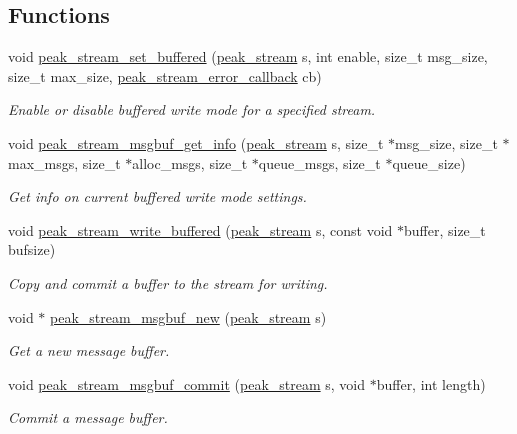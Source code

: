 \subsection*{Functions}
\begin{CompactItemize}
\item 
void \hyperlink{group__stream__buf_ga1}{peak\_\-stream\_\-set\_\-buffered} (\hyperlink{group__stream_ga0}{peak\_\-stream} s, int enable, size\_\-t msg\_\-size, size\_\-t max\_\-size, \hyperlink{group__stream__buf_ga0}{peak\_\-stream\_\-error\_\-callback} cb)
\begin{CompactList}\small\item\em Enable or disable buffered write mode for a specified stream. \item\end{CompactList}\item 
void \hyperlink{group__stream__buf_ga2}{peak\_\-stream\_\-msgbuf\_\-get\_\-info} (\hyperlink{group__stream_ga0}{peak\_\-stream} s, size\_\-t $\ast$msg\_\-size, size\_\-t $\ast$max\_\-msgs, size\_\-t $\ast$alloc\_\-msgs, size\_\-t $\ast$queue\_\-msgs, size\_\-t $\ast$queue\_\-size)
\begin{CompactList}\small\item\em Get info on current buffered write mode settings. \item\end{CompactList}\item 
void \hyperlink{group__stream__buf_ga3}{peak\_\-stream\_\-write\_\-buffered} (\hyperlink{group__stream_ga0}{peak\_\-stream} s, const void $\ast$buffer, size\_\-t bufsize)
\begin{CompactList}\small\item\em Copy and commit a buffer to the stream for writing. \item\end{CompactList}\item 
void $\ast$ \hyperlink{group__stream__buf_ga4}{peak\_\-stream\_\-msgbuf\_\-new} (\hyperlink{group__stream_ga0}{peak\_\-stream} s)
\begin{CompactList}\small\item\em Get a new message buffer. \item\end{CompactList}\item 
void \hyperlink{group__stream__buf_ga5}{peak\_\-stream\_\-msgbuf\_\-commit} (\hyperlink{group__stream_ga0}{peak\_\-stream} s, void $\ast$buffer, int length)
\begin{CompactList}\small\item\em Commit a message buffer. \item\end{CompactList}\item 

\end{CompactItemize}
